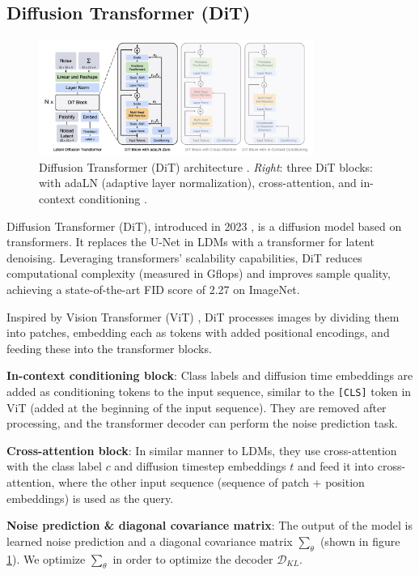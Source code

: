 \subsection{Diffusion Transformer (DiT)}
\label{appendix:diffusion_transformer}

\begin{figure}
    \centering
    \includegraphics[width=0.8\textwidth]{images/appendix/diffusion_transformer/architecture.png}
    \caption{Diffusion Transformer (DiT) architecture \cite{diffusion_transformer}. \textit{Right}: three DiT blocks: with adaLN (adaptive layer normalization), cross-attention, and in-context conditioning \cite{diffusion_transformer}.}
    \label{fig:diffusion_transformer_architecture}
\end{figure}


Diffusion Transformer (DiT), introduced in 2023 \cite{diffusion_transformer}, is a diffusion model based on transformers. It replaces the U-Net in LDMs with a transformer for latent denoising. Leveraging transformers' scalability capabilities, DiT reduces computational complexity (measured in Gflops) and improves sample quality, achieving a state-of-the-art FID score of 2.27 on ImageNet.

Inspired by Vision Transformer (ViT) \cite{vision_transformer}, DiT processes images by dividing them into patches, embedding each as tokens with added positional encodings, and feeding these into the transformer blocks.

\textbf{In-context conditioning block}: Class labels and diffusion time embeddings are added as conditioning tokens to the input sequence, similar to the \texttt{[CLS]} token in ViT (added at the beginning of the input sequence). They are removed after processing, and the transformer decoder can perform the noise prediction task.

\textbf{Cross-attention block}: In similar manner to LDMs, they use cross-attention with the class label $c$ and diffusion timestep embeddings $t$ and feed it into cross-attention, where the other input sequence (sequence of patch + position embeddings) is used as the query.

\textbf{Noise prediction \& diagonal covariance matrix}: The output of the model is learned noise prediction and a diagonal covariance matrix $\sum_\theta$ (shown in figure \ref{fig:diffusion_transformer_architecture}). We optimize $\sum_\theta$ in order to optimize the decoder $\mathcal{D}_{KL}$.

